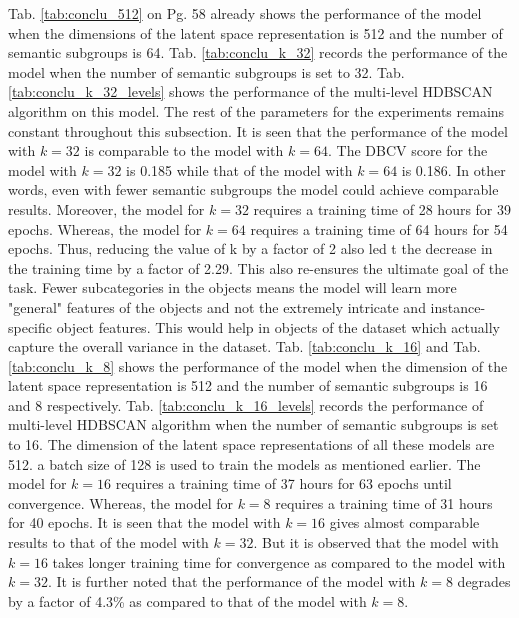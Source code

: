 Tab. \ref{tab:conclu_512} on Pg. 58 already shows the performance of the model when the dimensions of the latent space representation is 512 and the number of semantic subgroups is 64. Tab. \ref{tab:conclu_k_32} records the performance of the model when the number of semantic subgroups is set to 32. Tab. \ref{tab:conclu_k_32_levels} shows the performance of the multi-level \ac{HDBSCAN} algorithm on this model. The rest of the parameters for the experiments remains constant throughout this subsection. It is seen that the performance of the model with $k=32$ is comparable to the model with $k=64$. The \ac{DBCV} score for the model with $k=32$ is 0.185 while that of the model with $k=64$ is 0.186. In other words, even with fewer semantic subgroups the model could achieve comparable results. Moreover, the model for $k=32$ requires a training time of 28 hours for 39 epochs. Whereas, the model for $k=64$ requires a training time of 64 hours for 54 epochs. Thus, reducing the value of k by a factor of 2 also led t the decrease in the training time by a factor of 2.29. This also re-ensures the ultimate goal of the task. Fewer subcategories in the objects means the model will learn more "general" features of the objects and not the extremely intricate and instance-specific object features. This would help in objects of the dataset which actually capture the overall variance in the dataset. Tab. \ref{tab:conclu_k_16} and Tab. \ref{tab:conclu_k_8} shows the performance of the model when the dimension of the latent space representation is 512 and the number of semantic subgroups is 16 and 8 respectively.  Tab. \ref{tab:conclu_k_16_levels} records the performance of multi-level \ac{HDBSCAN} algorithm when the number of semantic subgroups is set to 16. The dimension of the latent space representations of all these models are 512. a batch size of 128 is used to train the models as mentioned earlier. The model for $k=16$ requires a training time of 37 hours for 63 epochs until convergence. Whereas, the model for $k=8$ requires a training time of 31 hours for 40 epochs. It is seen that the model with $k=16$ gives almost comparable results to that of the model with $k=32$. But it is observed that the model with $k=16$ takes longer training time for convergence as compared to the model with $k=32$. It is further noted that the performance of the model with $k=8$ degrades by a factor of 4.3\% as compared to that of the model with $k=8$.

